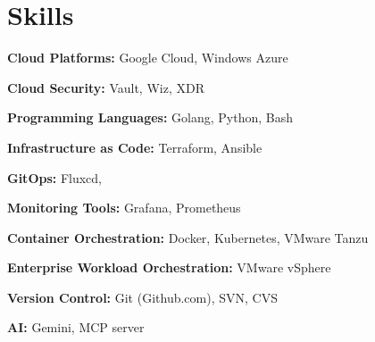 \documentclass[11pt]{article}       %
\begin{document}
\section*{Skills}
\begin{description}
\begin{multicols*}{2}
\item\textbf{Cloud Platforms:} Google Cloud, Windows Azure
\vspace{-9.5pt}
\item\textbf{Cloud Security:} Vault, Wiz, XDR
\vspace{-9.5pt}
\item\textbf{Programming Languages:} Golang, Python, Bash
\vspace{-9.5pt}
\item\textbf{Infrastructure as Code:} Terraform, Ansible
\vspace{-9.5pt}
\item\textbf{GitOps:} Fluxcd,
\columnbreak
\item\textbf{Monitoring Tools:} Grafana, Prometheus
\vspace{-9.5pt}
\item\textbf{Container Orchestration:} Docker, Kubernetes, VMware Tanzu
\vspace{-9.5pt}
\item\textbf{Enterprise Workload Orchestration:} VMware vSphere
\vspace{-9.5pt}
\item\textbf{Version Control:} Git (Github.com), SVN, CVS
\vspace{-9.5pt}
\item\textbf{AI:} Gemini, MCP server
\end{multicols*}
\end{description}

\vspace{-18.5pt}

\end{document}
